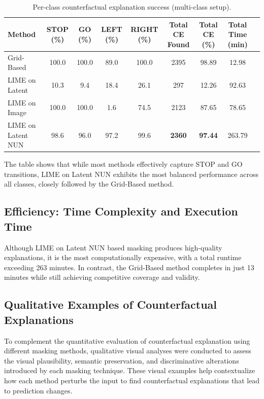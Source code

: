 \begin{table}[htbp]
\centering
\scriptsize
\begin{tabular}{lcccccccc}
\toprule
\textbf{Method} & \textbf{STOP (\%)} & \textbf{GO (\%)} & \textbf{LEFT (\%)} & \textbf{RIGHT (\%)} & \textbf{Total CE Found} & \textbf{Total CE (\%)} & \textbf{Total Time (min)} \\
\midrule
Grid-Based        & 100.0 & 100.0 & 89.0  & 100.0 & 2395 & 98.89 & 12.98 \\
LIME on Latent    & 10.3  & 9.4   & 18.4  & 26.1  & 297  & 12.26 & 92.63 \\
LIME on Image     & 100.0 & 100.0 & 1.6   & 74.5  & 2123 & 87.65 & 78.65 \\
LIME on Latent NUN & 98.6  & 96.0  & 97.2  & 99.6  & \textbf{2360} & \textbf{97.44} & 263.79 \\
\bottomrule
\end{tabular}
\caption{Per-class counterfactual explanation success (multi-class setup).}
\label{tab:classwise_ce_multi}
\end{table}

The table shows that while most methods effectively capture STOP and GO transitions, LIME on Latent NUN exhibits the most balanced performance across all classes, closely followed by the Grid-Based method.




\vspace{1em}


\subsection{Efficiency: Time Complexity and Execution Time}
Although LIME on Latent NUN based masking produces high-quality explanations, it is the most computationally expensive, with a total runtime exceeding 263 minutes. In contrast, the Grid-Based method completes in just 13 minutes while still achieving competitive coverage and validity.



\subsection{Qualitative Examples of Counterfactual Explanations} \label{subsubsec:qualitative_examples}
To complement the quantitative evaluation of counterfactual explanation using different masking methods, qualitative visual analyses were conducted to assess the visual plausibility, semantic preservation, and discriminative alterations introduced by each masking technique. These visual examples help contextualize how each method perturbs the input to find counterfactual explanations that lead to prediction changes.

